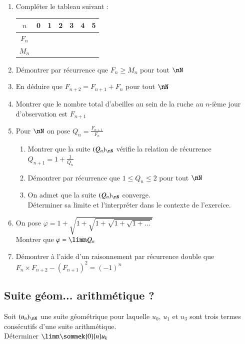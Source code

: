 \documentclass[oneside,12pt]{article}          %
\begin{document}
\begin{enumerate}
    \item Compléter le tableau suivant :
    \begin{center}
        \renewcommand{\arraystretch}{1.5}
        \setlength{\tabcolsep}{25pt}
        \begin{tabular}{|c|c|c|c|c|c|c|}\hline
            $n$ & 0 & 1 & 2 & 3 & 4 & 5 \\ \hline
            $F_n$ & & & & & & \\ \hline
            $M_n$ & & & & & & \\ \hline
        \end{tabular}
    \end{center}

    \item Démontrer par récurrence que $F_n\geq M_n$ pour tout $\nN$
    \item En déduire que $F_{n+2}=F_{n+1}+F_n$ pour tout $\nN$
    \item Montrer que le nombre total d'abeilles au sein de la ruche au $n$-ième jour d'observation est $F_{n+1}$
    \item Pour $\nN$ on pose $Q_n=\frac{F_{n+1}}{F_n}$
    \begin{enumerate}
        \item Montrer que la suite $(Q_n)_{\nN}$ vérifie la relation de récurrence $Q_{n+1}=1+\frac{1}{Q_n}$
        \item Démontrer par récurrence que $1\leq Q_n\leq2$ pour tout $\nN$
        \item On admet que la suite $(Q_n)_{\nN}$ converge.\\Déterminer sa limite et l'interpréter dans le contexte de l'exercice.
    \end{enumerate}
    \item On pose $\varphi = 1+\sqrt{1+\sqrt{1+\sqrt{1+\sqrt{1+\ldots}}}}$\\[5pt]
    Montrer que $\varphi=\limn Q_n$
    \item Démontrer à l'aide d'un raisonnement par récurrence double que $F_n\times F_{n+2}-\left(F_{n+1}\right)^2=(-1)^n$
\end{enumerate}



\subsection{Suite géom... arithmétique ?}
Soit $(u_n)_{\nN}$ une suite géométrique pour laquelle $u_0$, $u_1$ et $u_3$ sont trois termes consécutifs d'une suite arithmétique.\\
Déterminer $\limn \sommek{0}{n}u_k$
\end{document}
